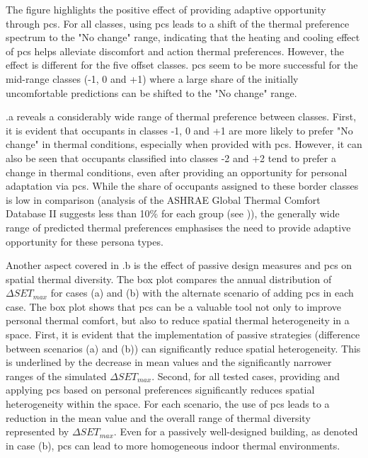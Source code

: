 The figure highlights the positive effect of providing adaptive opportunity through \gls{pcs}. For all classes, using \gls{pcs} leads to a shift of the thermal preference spectrum to the "No change" range, indicating that the heating and cooling effect of \gls{pcs} helps alleviate discomfort and action thermal preferences. However, the effect is different for the five offset classes. \gls{pcs} seem to be more successful for the mid-range classes (-1, 0 and +1) where a large share of the initially uncomfortable predictions can be shifted to the "No change" range.

.a reveals a considerably wide range of thermal preference between classes. First, it is evident that occupants in classes -1, 0 and +1 are more likely to prefer "No change" in thermal conditions, especially when provided with \gls{pcs}. However, it can also be seen that occupants classified into classes -2 and +2 tend to prefer a change in thermal conditions, even after providing an opportunity for personal adaptation via \gls{pcs}. While the share of occupants assigned to these border classes is low in comparison (analysis of the ASHRAE Global Thermal Comfort Database II suggests less than 10\% for each group (see )), the generally wide range of predicted thermal preferences emphasises the need to provide adaptive opportunity for these persona types.

Another aspect covered in .b is the effect of passive design measures and \gls{pcs} on spatial thermal diversity. The box plot compares the annual distribution of $\Delta SET_{max}$ for cases (a) and (b) with the alternate scenario of adding \gls{pcs} in each case. The box plot shows that \gls{pcs} can be a valuable tool not only to improve personal thermal comfort, but also to reduce spatial thermal heterogeneity in a space. First, it is evident that the implementation of passive strategies (difference between scenarios (a) and (b)) can significantly reduce spatial heterogeneity. This is underlined by the decrease in mean values and the significantly narrower ranges of the simulated $\Delta SET_{max}$. Second, for all tested cases, providing and applying \gls{pcs} based on personal preferences significantly reduces spatial heterogeneity within the space. For each scenario, the use of \gls{pcs} leads to a reduction in the mean value and the overall range of thermal diversity represented by $\Delta SET_{max}$. Even for a passively well-designed building, as denoted in case (b), \gls{pcs} can lead to more homogeneous indoor thermal environments.

